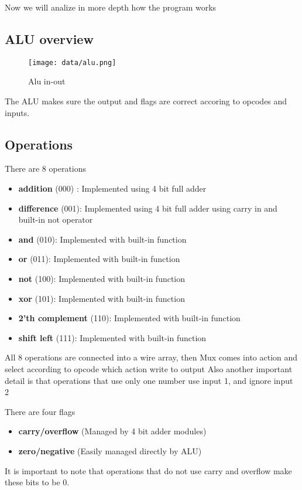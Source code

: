 Now we will analize in more depth how the program works

\subsection*{ALU overview}

\begin{figure}[H]
  \begin{centering}
  \texttt{[image: data/alu.png]}
  \par\end{centering}
  \caption{Alu in-out}
\end{figure}

The ALU makes sure the output and flags are correct accoring to opcodes and inputs.
\subsection*{Operations}
There are 8 operations
\begin{itemize}
  \item \textbf{addition} (000) : Implemented using 4 bit full adder
  \item \textbf{difference} (001): Implemented using 4 bit full adder using carry in and built-in not operator
  \item \textbf{and} (010): Implemented with built-in function
  \item \textbf{or} (011): Implemented with built-in function
  \item \textbf{not} (100): Implemented with built-in function
  \item \textbf{xor} (101): Implemented with built-in function
  \item \textbf{2'th complement} (110): Implemented with built-in function
  \item \textbf{shift left} (111): Implemented with built-in function
\end{itemize}

All 8 operations are connected into a wire array, then Mux comes into action and select according to opcode which action write to output
Also another important detail is that operations that use only one number use input 1, and ignore input 2

There are four flags
\begin{itemize}
  \item \textbf{carry/overflow} (Managed by 4 bit adder modules)
  \item \textbf{zero/negative} (Easily managed directly by ALU)
\end{itemize}
It is important to note that operations that do not use carry and overflow make these bits to be 0.

